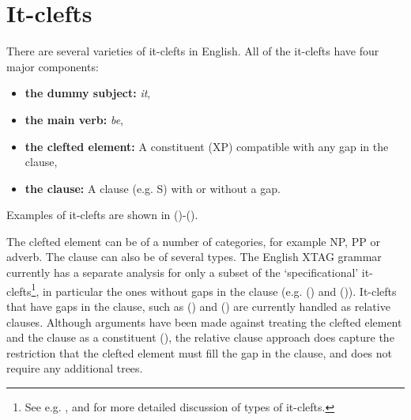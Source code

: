 \chapter{It-clefts}
\label{it-clefts}

There are several varieties of it-clefts in English.  All of the
it-clefts have four major components:

\begin{itemize}
\item {\bf the dummy subject:}  {\it it},
\item {\bf the main verb:}  {\it be},
\item {\bf the clefted element:}  A constituent (XP) compatible with
any gap in the clause,
\item {\bf the clause:}  A clause (e.g. S) with or without a gap.
\end{itemize}

\noindent
Examples of it-clefts are shown in ()-().

\enumsentence{It is [$_{XP}$ spirit$_{XP}$]  [$_{S}$ which gives life
to a community and causes it to cohere. (Brown corpus)}

The clefted element can be of a number of categories, for example NP, PP or
adverb. The clause can also be of several types. The English XTAG grammar
currently has a separate analysis for only a subset of the `specificational'
it-clefts\footnote{See e.g. \cite{Ball91},
\cite{Delin89} and \cite{Delahunty84} for more detailed discussion of
types of it-clefts.}, in particular the ones without gaps in the clause
(e.g. () and ()).  It-clefts that have gaps in the clause, such
as () and () are currently handled as relative clauses. Although
arguments have been made against treating the clefted element and the clause as
a constituent (\cite{Delahunty84}), the relative clause approach does capture
the restriction that the clefted element must fill the gap in the clause, and
does not require any additional trees.

